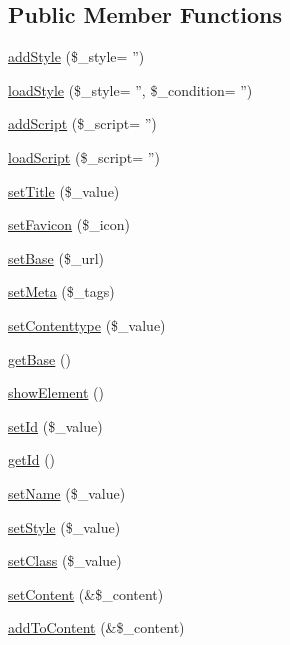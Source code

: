 \subsection*{Public Member Functions}
\begin{DoxyCompactItemize}
\item 
\hyperlink{classDocument_a11fb4959fcf6fd570e00d09dd572ca61}{addStyle} (\$\_\-style= '')
\item 
\hyperlink{classDocument_a90810fa2ea28179748a865531c7fc263}{loadStyle} (\$\_\-style= '', \$\_\-condition= '')
\item 
\hyperlink{classDocument_a0e77dfc94e5f3572a2fc912b704378c8}{addScript} (\$\_\-script= '')
\item 
\hyperlink{classDocument_a9e088502436fe985b501cb5650ab022d}{loadScript} (\$\_\-script= '')
\item 
\hyperlink{classDocument_acf134e4b0894a2a8ad1757b17f18bd9e}{setTitle} (\$\_\-value)
\item 
\hyperlink{classDocument_afca18e2b74a78d2954303a96ffa3d63d}{setFavicon} (\$\_\-icon)
\item 
\hyperlink{classDocument_a4fa96cab10bfe15cd26e5c1110ddd9d7}{setBase} (\$\_\-url)
\item 
\hyperlink{classDocument_ace35c2c3f3b17e07468c740eaed49ecb}{setMeta} (\$\_\-tags)
\item 
\hyperlink{classDocument_ae9c4b59120e4b4d7064ced9f13fdf91b}{setContenttype} (\$\_\-value)
\item 
\hyperlink{classDocument_a9b42f2549537d4457c16d80368f9aea8}{getBase} ()
\item 
\hyperlink{classDocument_a20e6d0abbac866da5d651d1a49f8cf4f}{showElement} ()
\item 
\hyperlink{classBaseElement_a0c1ce3d1684ecb78960cf7a97278494e}{setId} (\$\_\-value)
\item 
\hyperlink{classBaseElement_a4a7aa583ee21af392908d7fd42fde790}{getId} ()
\item 
\hyperlink{classBaseElement_a39bafb3609d10048920c20242c2a04c5}{setName} (\$\_\-value)
\item 
\hyperlink{classBaseElement_a6b2b9ff69f6e92db82f91d9c55cda697}{setStyle} (\$\_\-value)
\item 
\hyperlink{classBaseElement_af6597b30fa9798878f6290271043dfa2}{setClass} (\$\_\-value)
\item 
\hyperlink{classBaseElement_a164a9c6e4ee68afa0ad343942ba54d28}{setContent} (\&\$\_\-content)
\item 
\hyperlink{classBaseElement_abd48eef64ca4f419f26d66a0c0419908}{addToContent} (\&\$\_\-content)

\end{DoxyCompactItemize}
